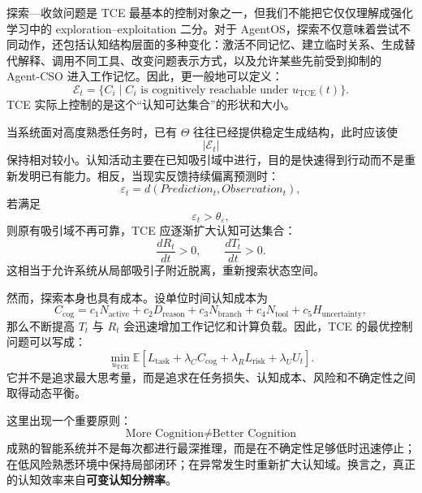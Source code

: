 探索—收敛问题是 TCE 最基本的控制对象之一，但我们不能把它仅仅理解成强化学习中的 exploration--exploitation 二分。对于 AgentOS，探索不仅意味着尝试不同动作，还包括认知结构层面的多种变化：激活不同记忆、建立临时关系、生成替代解释、调用不同工具、改变问题表示方式，以及允许某些先前受到抑制的 Agent-CSO 进入工作记忆。因此，更一般地可以定义：
\begin{equation}
    \mathcal E_t
    =
    \{
    C_i
    \mid
    C_i
    \text{ is cognitively reachable under }u_{\mathrm{TCE}}(t)
    \}.
\end{equation}
TCE 实际上控制的是这个“认知可达集合”的形状和大小。

当系统面对高度熟悉任务时，已有 $\Theta$ 往往已经提供稳定生成结构，此时应该使
\begin{equation}
    |\mathcal E_t|
\end{equation}
保持相对较小。认知活动主要在已知吸引域中进行，目的是快速得到行动而不是重新发明已有能力。相反，当现实反馈持续偏离预测时：
\begin{equation}
    \varepsilon_t
    =
    d(
    Prediction_t,
    Observation_t
    ),
\end{equation}
若满足
\begin{equation}
    \varepsilon_t>\theta_\varepsilon,
\end{equation}
则原有吸引域不再可靠，TCE 应逐渐扩大认知可达集合：
\begin{equation}
    \frac{dR_t}{dt}>0,
    \qquad
    \frac{dT_t}{dt}>0.
\end{equation}
这相当于允许系统从局部吸引子附近脱离，重新搜索状态空间。

然而，探索本身也具有成本。设单位时间认知成本为
\begin{equation}
    C_{\mathrm{cog}}
    =
    c_1N_{\mathrm{active}}
    +
    c_2D_{\mathrm{reason}}
    +
    c_3N_{\mathrm{branch}}
    +
    c_4N_{\mathrm{tool}}
    +
    c_5H_{\mathrm{uncertainty}},
\end{equation}
那么不断提高 $T_t$ 与 $R_t$ 会迅速增加工作记忆和计算负载。因此，TCE 的最优控制问题可以写成：
\begin{equation}
    \min_{u_{\mathrm{TCE}}}
    \mathbb E
    \left[
    L_{\mathrm{task}}
    +
    \lambda_C C_{\mathrm{cog}}
    +
    \lambda_R L_{\mathrm{risk}}
    +
    \lambda_U U_t
    \right].
\end{equation}
它并不是追求最大思考量，而是追求在任务损失、认知成本、风险和不确定性之间取得动态平衡。

这里出现一个重要原则：
\begin{equation}
    \boxed{
    \text{More Cognition}
    \neq
    \text{Better Cognition}
    }
\end{equation}
成熟的智能系统并不是每次都进行最深推理，而是在不确定性足够低时迅速停止；在低风险熟悉环境中保持局部闭环；在异常发生时重新扩大认知域。换言之，真正的认知效率来自\textbf{可变认知分辨率}。

